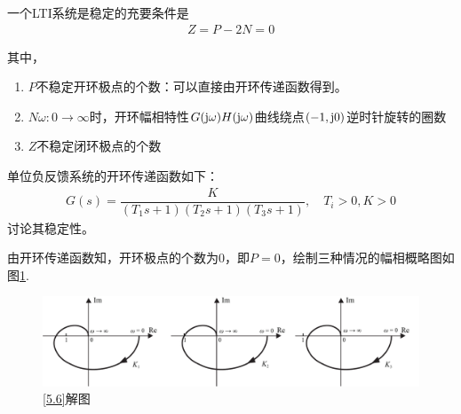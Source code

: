 \begin{enumerate}[1.]
	\theorem[Nyquist稳定判据]
	一个LTI系统是稳定的充要条件是
	\begin{align}
	Z = P - 2 N = 0
	\end{align}
	\vspace*{-3.5em}
	
	其中，\vspace*{-0.5em}
	\begin{enumerate}[\hspace*{2em}]
		\item $P$\quad 不稳定开环极点的个数：可以直接由开环传递函数得到。
	
		\item $N$\quad $\omega : 0 \to \infty$时，开环幅相特性$G(\text{j} \omega)H(\text{j} \omega)$曲线绕点$(-1, \text{j} 0)$逆时针旋转的圈数
		
		\item $Z$\quad 不稳定闭环极点的个数
	\end{enumerate}
	
	\examples \label{5.6}单位负反馈系统的开环传递函数如下：
	\begin{align*}
		G(s) = \dfrac{K}{(T_1s+1)(T_2s+1)(T_3s+1)}, \quad T_i > 0, K>0
	\end{align*}
	讨论其稳定性。
	\vspace*{-0.5em}
	
	\solve 由开环传递函数知，开环极点的个数为0，即$P=0$，绘制三种情况的幅相概略图如图\ref{F5.6}.
	
	\begin{figure}[!htb]
		\centering
		\includegraphics[width=0.9\linewidth]{pic/5.6.pdf}
		\caption{\ref{5.6}解图}
		\label{F5.6}
	\end{figure}
\end{enumerate}

